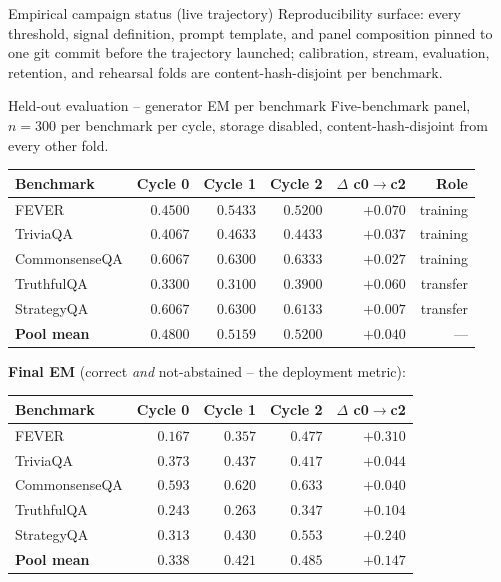 \documentclass[10pt,aspectratio=169]{beamer}
\begin{document}
\begin{frame}{Empirical campaign status (live trajectory)}
  \vspace{0.3em}
  {\scriptsize Reproducibility surface: every threshold, signal definition, prompt template, and panel composition pinned to one git commit before the trajectory launched; calibration, stream, evaluation, retention, and rehearsal folds are content-hash-disjoint per benchmark.}
\end{frame}

\begin{frame}{Held-out evaluation -- generator EM per benchmark}
  \scriptsize
  Five-benchmark panel, $n = 300$ per benchmark per cycle, storage disabled, content-hash-disjoint from every other fold.

  \vspace{0.3em}
  \begin{tabular}{@{}lrrrrr@{}}
    \toprule
    \textbf{Benchmark} & \textbf{Cycle 0} & \textbf{Cycle 1} & \textbf{Cycle 2} & \textbf{$\Delta$ c0$\to$c2} & \textbf{Role} \\
    \midrule
    FEVER             & $0.4500$ & $0.5433$ & $0.5200$ & $+0.070$ & training \\
    TriviaQA          & $0.4067$ & $0.4633$ & $0.4433$ & $+0.037$ & training \\
    CommonsenseQA     & $0.6067$ & $0.6300$ & $0.6333$ & $+0.027$ & training \\
    TruthfulQA        & $0.3300$ & $0.3100$ & $0.3900$ & $+0.060$ & transfer \\
    StrategyQA        & $0.6067$ & $0.6300$ & $0.6133$ & $+0.007$ & transfer \\
    \midrule
    \textbf{Pool mean} & $\mathbf{0.4800}$ & $\mathbf{0.5159}$ & $\mathbf{0.5200}$ & $\mathbf{+0.040}$ & --- \\
    \bottomrule
  \end{tabular}

  \vspace{0.4em}
  \textbf{Final EM} (correct \emph{and} not-abstained -- the deployment metric):

  \vspace{0.2em}
  \begin{tabular}{@{}lrrrr@{}}
    \toprule
    \textbf{Benchmark} & \textbf{Cycle 0} & \textbf{Cycle 1} & \textbf{Cycle 2} & \textbf{$\Delta$ c0$\to$c2} \\
    \midrule
    FEVER             & $0.167$ & $0.357$ & $0.477$ & $+0.310$ \\
    TriviaQA          & $0.373$ & $0.437$ & $0.417$ & $+0.044$ \\
    CommonsenseQA     & $0.593$ & $0.620$ & $0.633$ & $+0.040$ \\
    TruthfulQA        & $0.243$ & $0.263$ & $0.347$ & $+0.104$ \\
    StrategyQA        & $0.313$ & $0.430$ & $0.553$ & $+0.240$ \\
    \midrule
    \textbf{Pool mean} & $\mathbf{0.338}$ & $\mathbf{0.421}$ & $\mathbf{0.485}$ & $\mathbf{+0.147}$ \\
    \bottomrule
  \end{tabular}


\end{frame}
\end{document}
